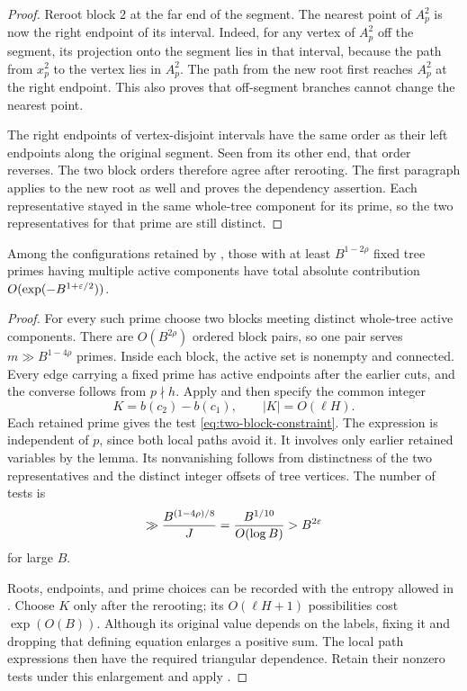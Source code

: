 \begin{proof}
Reroot block 2 at the far end of the segment.  The nearest point
of $A_p^2$ is now the right endpoint of its interval.  Indeed, for
any vertex of $A_p^2$ off the segment, its projection onto the
segment lies in that interval, because the path from $x_p^2$ to
the vertex lies in $A_p^2$.  The path from the new root first
reaches $A_p^2$ at the right endpoint.  This also proves that
off-segment branches cannot change the nearest point.

The right endpoints of vertex-disjoint intervals have the same
order as their left endpoints along the original segment.  Seen
from its other end, that order reverses.  The two block orders
therefore agree after rerooting.  The first paragraph applies to
the new root as well and proves the dependency assertion.  Each
representative stayed in the same whole-tree component for its
prime, so the two representatives for that prime are still distinct.
\end{proof}

\begin{lemma}\label{lem:few-disconnected}
Among the configurations retained by ,
those with at least $B^{1-2\rho}$ fixed tree primes having multiple
active components have total absolute contribution
$O(\exp(-B^{1+\varepsilon/2}))$.
\end{lemma}

\begin{proof}
For every such prime choose two blocks meeting distinct whole-tree
active components.  There are $O(B^{2\rho})$ ordered block pairs,
so one pair serves $m\gg B^{1-4\rho}$ primes.  Inside each block,
the active set is nonempty and connected.  Every edge carrying a
fixed prime has active endpoints after the earlier cuts, and the
converse follows from $p\nmid h$.  Apply
 and then specify the common integer
\[
 K=b(c_2)-b(c_1),\qquad |K|=O(\ell H).
\]
Each retained prime gives the test \eqref{eq:two-block-constraint}.
The expression is independent of $p$, since both local paths
avoid it.  It involves only earlier retained variables by the
lemma.  Its nonvanishing follows from distinctness of the two
representatives and the distinct integer offsets of tree vertices.
The number of tests is
\[
 \gg \frac{B^{(1-4\rho)/8}}{J}
   =\frac{B^{1/10}}{O(\log B)}>B^{2\varepsilon}
\]
for large $B$.

Roots, endpoints, and prime choices can be recorded with the
entropy allowed in .  Choose $K$ only
after the rerooting; its $O(\ell H+1)$ possibilities cost
$\exp(O(B))$.  Although its original value depends on the labels,
fixing it and dropping that defining equation enlarges a positive
sum.  The local path expressions then have the required triangular
dependence.  Retain their nonzero tests under this enlargement and
apply .
\end{proof}


